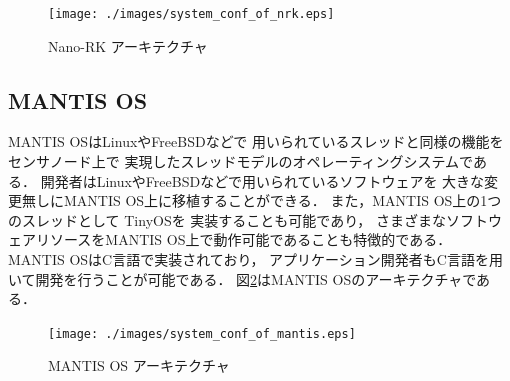 \begin{figure}[htbp]
 \begin{center}
  \texttt{[image: ./images/system\_conf\_of\_nrk.eps]}
 \end{center}
 \caption{Nano-RK アーキテクチャ}
 \label{fig:system_conf_of_nrk}
\end{figure}



\subsection{MANTIS OS}
MANTIS OS\cite{Bhatti:2005:MOE:1160162.1160178}はLinuxやFreeBSDなどで
用いられているスレッドと同様の機能をセンサノード上で
実現したスレッドモデルのオペレーティングシステムである．
開発者はLinuxやFreeBSDなどで用いられているソフトウェアを
大きな変更無しにMANTIS OS上に移植することができる．
また，MANTIS OS上の1つのスレッドとして
TinyOS\cite{Hill:2000:SAD:356989.356998}\cite{Levis04tinyos:an}を
実装することも可能であり\cite{Trumpler06asystematic}，
さまざまなソフトウェアリソースをMANTIS OS上で動作可能であることも特徴的である．
MANTIS OSはC言語で実装されており，
アプリケーション開発者もC言語を用いて開発を行うことが可能である．
図\ref{fig:system_conf_of_mantis}はMANTIS OSのアーキテクチャである．


\begin{figure}[htbp]
 \begin{center}
  \texttt{[image: ./images/system\_conf\_of\_mantis.eps]}
 \end{center}
 \caption{MANTIS OS アーキテクチャ}
 \label{fig:system_conf_of_mantis}
\end{figure}



